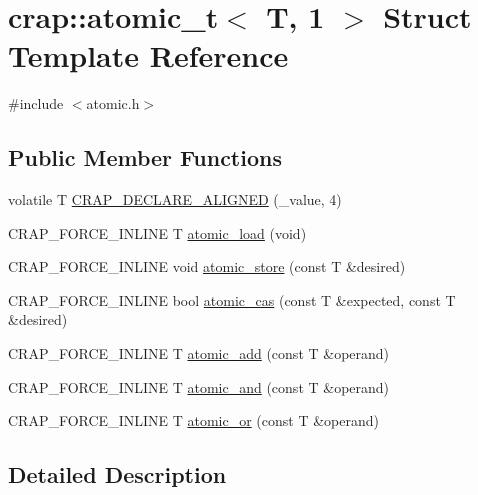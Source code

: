 \hypertarget{structcrap_1_1atomic__t_3_01_t_00_011_01_4}{\section{crap\+:\+:atomic\+\_\+t$<$ T, 1 $>$ Struct Template Reference}
\label{structcrap_1_1atomic__t_3_01_t_00_011_01_4}
}


{\ttfamily \#include $<$atomic.\+h$>$}

\subsection*{Public Member Functions}
\begin{DoxyCompactItemize}
\item 
volatile T \hyperlink{structcrap_1_1atomic__t_3_01_t_00_011_01_4_afd81f6a8e1e83cea8b19ccd586eb3157}{C\+R\+A\+P\+\_\+\+D\+E\+C\+L\+A\+R\+E\+\_\+\+A\+L\+I\+G\+N\+E\+D} (\+\_\+value, 4)
\item 
C\+R\+A\+P\+\_\+\+F\+O\+R\+C\+E\+\_\+\+I\+N\+L\+I\+N\+E T \hyperlink{structcrap_1_1atomic__t_3_01_t_00_011_01_4_a2cf047092e5bca48244359e8fb19cf19}{atomic\+\_\+load} (void)
\item 
C\+R\+A\+P\+\_\+\+F\+O\+R\+C\+E\+\_\+\+I\+N\+L\+I\+N\+E void \hyperlink{structcrap_1_1atomic__t_3_01_t_00_011_01_4_a3c0b48d359eece05bddc214d51124993}{atomic\+\_\+store} (const T \&desired)
\item 
C\+R\+A\+P\+\_\+\+F\+O\+R\+C\+E\+\_\+\+I\+N\+L\+I\+N\+E bool \hyperlink{structcrap_1_1atomic__t_3_01_t_00_011_01_4_a7225ed266b5dccbb11e493f4b5c1f392}{atomic\+\_\+cas} (const T \&expected, const T \&desired)
\item 
C\+R\+A\+P\+\_\+\+F\+O\+R\+C\+E\+\_\+\+I\+N\+L\+I\+N\+E T \hyperlink{structcrap_1_1atomic__t_3_01_t_00_011_01_4_a269613ef748ea117a2e1c665e1d5b95f}{atomic\+\_\+add} (const T \&operand)
\item 
C\+R\+A\+P\+\_\+\+F\+O\+R\+C\+E\+\_\+\+I\+N\+L\+I\+N\+E T \hyperlink{structcrap_1_1atomic__t_3_01_t_00_011_01_4_ae9f77093d72f7e129d428251704bc321}{atomic\+\_\+and} (const T \&operand)
\item 
C\+R\+A\+P\+\_\+\+F\+O\+R\+C\+E\+\_\+\+I\+N\+L\+I\+N\+E T \hyperlink{structcrap_1_1atomic__t_3_01_t_00_011_01_4_afdc23e5038b16ef27b27326a3edb8fd4}{atomic\+\_\+or} (const T \&operand)
\end{DoxyCompactItemize}


\subsection{Detailed Description}
